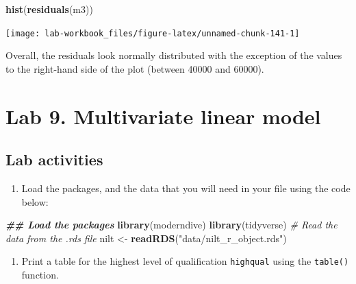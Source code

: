 \documentclass[
]{book}
\newenvironment{Shaded}{\begin{snugshade}}{\end{snugshade}}
\newcommand{\CommentTok}[1]{\textcolor[rgb]{0.56,0.35,0.01}{\textit{#1}}}
\newcommand{\DocumentationTok}[1]{\textcolor[rgb]{0.56,0.35,0.01}{\textbf{\textit{#1}}}}
\newcommand{\FunctionTok}[1]{\textcolor[rgb]{0.13,0.29,0.53}{\textbf{#1}}}
\newcommand{\NormalTok}[1]{#1}
\newcommand{\OtherTok}[1]{\textcolor[rgb]{0.56,0.35,0.01}{#1}}
\newcommand{\StringTok}[1]{\textcolor[rgb]{0.31,0.60,0.02}{#1}}
\providecommand{\tightlist}{%
  \setlength{\itemsep}{0pt}\setlength{\parskip}{0pt}}
\begin{document}
\begin{Shaded}
\begin{Highlighting}[]
\FunctionTok{hist}\NormalTok{(}\FunctionTok{residuals}\NormalTok{(m3))}
\end{Highlighting}
\end{Shaded}

\begin{flushleft}\texttt{[image: lab-workbook\_files/figure-latex/unnamed-chunk-141-1]} \end{flushleft}

Overall, the residuals look normally distributed with the exception of the values to the right-hand side of the plot (between 40000 and 60000).

\hypertarget{lab-9.-multivariate-linear-model}{%
\section{Lab 9. Multivariate linear model}\label{lab-9.-multivariate-linear-model}}

\hypertarget{lab-activities-3}{%
\subsection{Lab activities}\label{lab-activities-3}}

\begin{enumerate}
\def\labelenumi{\arabic{enumi}.}
\tightlist
\item
  Load the packages, and the data that you will need in your file using the code below:
\end{enumerate}

\begin{Shaded}
\begin{Highlighting}[]
\DocumentationTok{\#\# Load the packages}
\FunctionTok{library}\NormalTok{(moderndive)}
\FunctionTok{library}\NormalTok{(tidyverse)}
\CommentTok{\# Read the data from the .rds file}
\NormalTok{nilt }\OtherTok{\textless{}{-}} \FunctionTok{readRDS}\NormalTok{(}\StringTok{"data/nilt\_r\_object.rds"}\NormalTok{)}
\end{Highlighting}
\end{Shaded}

\begin{enumerate}
\def\labelenumi{\arabic{enumi}.}
\setcounter{enumi}{1}
\tightlist
\item
  Print a table for the highest level of qualification \texttt{highqual} using the \texttt{table()} function.
\end{enumerate}
\end{document}
